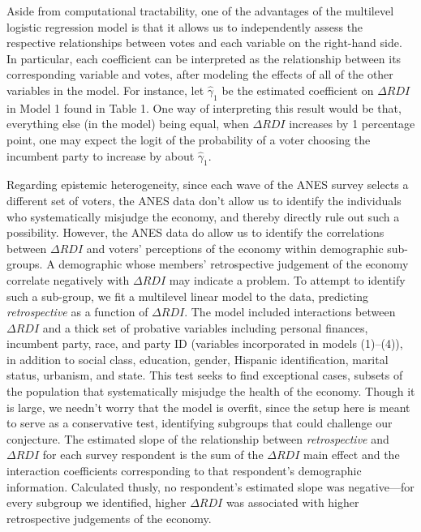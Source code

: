 \documentclass[11pt]{article}
\begin{document}
Aside from computational tractability, one of the advantages of the
multilevel logistic regression model is that it allows us to independently assess
the %
 respective relationships between votes and each variable on the
right-hand side.
In particular, each coefficient can be interpreted as the relationship
between its corresponding variable and votes, after modeling the effects of all of the other variables in the model.
For instance, let $\hat{\gamma}_{1}$ be the estimated coefficient on $\Delta RDI$ in Model 1 found in Table 1. %
One way of interpreting this result would be that, everything else (in
the model) being equal, when $\Delta RDI$ increases by 1 percentage
point, one may expect the logit of the probability of a voter choosing
the incumbent party to increase by about $\hat{\gamma}_{1}$.

Regarding epistemic heterogeneity, since each wave of the ANES survey selects a different set of voters, the ANES data don't allow us to identify the individuals who
systematically misjudge the economy, and thereby directly rule out
such a possibility.
However, the ANES data do allow us to identify the correlations between
$\Delta RDI$ and voters' perceptions of the economy within demographic
sub-groups.
A demographic whose members' retrospective judgement of the economy
correlate negatively with $\Delta RDI$ may indicate a problem.
To attempt to identify such a sub-group, we fit a multilevel linear model to the
data, predicting \emph{retrospective} as a function of $\Delta RDI$.
The model included interactions between $\Delta RDI$ and a thick set of probative variables including personal finances, incumbent party, race, and party ID (variables incorporated in models (1)--(4)), %
in addition to social class, education, gender, Hispanic
identification, marital status, urbanism, and state. This test seeks
to find exceptional cases, subsets of the population that
systematically misjudge the health of the economy.
Though it is large, we needn't worry that the model is overfit, since
the setup here is meant to serve as a conservative test, identifying
subgroups that could challenge our conjecture.
The estimated slope of the relationship between \emph{retrospective}
and $\Delta RDI$ for each survey respondent is the sum of the $\Delta
RDI$ main effect and the interaction coefficients corresponding to
that respondent's demographic information.
Calculated thusly, no respondent's estimated slope was negative---for
every subgroup we identified, higher $\Delta RDI$ was associated with
higher retrospective judgements of the economy.
\end{document}
